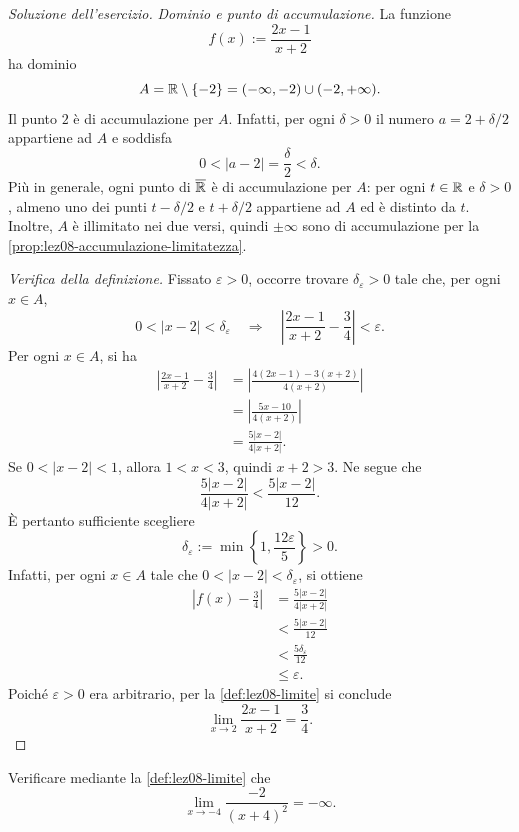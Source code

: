 \begin{proof}[Soluzione dell'esercizio]
\emph{Dominio e punto di accumulazione.}
La funzione
\[
  f(x):=\frac{2x-1}{x+2}
\]
ha dominio
\[
  A=\mathbb{R}\setminus\{-2\}
   =(-\infty,-2)\cup(-2,+\infty).
\]
Il punto \(2\) è di accumulazione per \(A\). Infatti,
per ogni \(\delta>0\) il numero \(a=2+\delta/2\)
appartiene ad \(A\) e soddisfa
\[
  0<|a-2|=\frac{\delta}{2}<\delta.
\]
Più in generale, ogni punto di \(\overline{\mathbb{R}}\) è di
accumulazione per \(A\): per ogni \(t\in\mathbb{R}\) e
\(\delta>0\), almeno uno dei punti \(t-\delta/2\)
e \(t+\delta/2\) appartiene ad \(A\) ed è distinto
da \(t\). Inoltre, \(A\) è illimitato nei due versi,
quindi \(\pm\infty\) sono di accumulazione per la
\cref{prop:lez08-accumulazione-limitatezza}.

\emph{Verifica della definizione.}
Fissato \(\varepsilon>0\), occorre trovare
\(\delta_\varepsilon>0\) tale che, per ogni \(x\in A\),
\[
  0<|x-2|<\delta_\varepsilon
  \quad\Longrightarrow\quad
  \left|\frac{2x-1}{x+2}-\frac34\right|<\varepsilon.
\]
Per ogni \(x\in A\), si ha
\begin{align*}
  \left|\frac{2x-1}{x+2}-\frac34\right|
  &=\left|\frac{4(2x-1)-3(x+2)}{4(x+2)}\right|\\
  &=\left|\frac{5x-10}{4(x+2)}\right|\\
  &=\frac{5|x-2|}{4|x+2|}.
\end{align*}
Se \(0<|x-2|<1\), allora \(1<x<3\),
quindi \(x+2>3\). Ne segue che
\[
  \frac{5|x-2|}{4|x+2|}
  <\frac{5|x-2|}{12}.
\]
È pertanto sufficiente scegliere
\[
  \delta_\varepsilon
  :=\min\left\{1,\frac{12\varepsilon}{5}\right\}>0.
\]
Infatti, per ogni \(x\in A\) tale che
\(0<|x-2|<\delta_\varepsilon\), si ottiene
\begin{align*}
  \left|f(x)-\frac34\right|
  &=\frac{5|x-2|}{4|x+2|}\\
  &<\frac{5|x-2|}{12}\\
  &<\frac{5\delta_\varepsilon}{12}\\
  &\le\varepsilon.
\end{align*}
Poiché \(\varepsilon>0\) era arbitrario, per la
\cref{def:lez08-limite} si conclude
\[
  \lim_{x\to2}\frac{2x-1}{x+2}=\frac34.
\]
\end{proof}

\begin{exercise}
\label{ex:lez08-razionale-meno-infinito}
Verificare mediante la \cref{def:lez08-limite} che
\[
  \lim_{x\to-4}\frac{-2}{(x+4)^2}=-\infty.
\]
\end{exercise}

